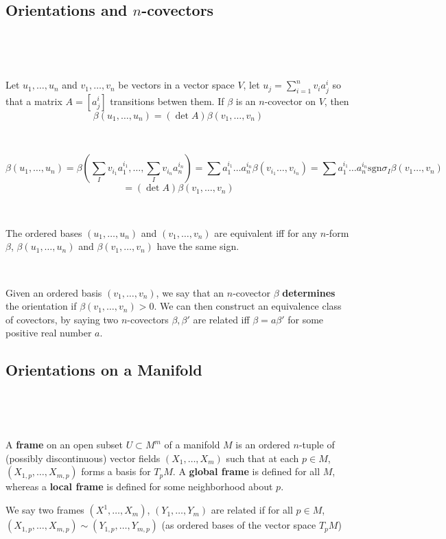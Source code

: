 \documentclass{article}
\begin{document}
\subsection{Orientations and $n$-covectors}
\

\begin{lemma}
  \

  Let $u_1, \dots, u_n$ and $v_1, \dots, v_n$ be vectors in a vector space $V$, let $u_j = \sum_{i=1}^n v_i a^i_j$ so that a matrix $A = [a^i_j]$ transitions betwen them. If $\beta$ is an $n$-covector on $V$, then $$\beta(u_1, \dots, u_n) = (\det A)\beta(v_1, \dots, v_n)$$
\end{lemma}

\begin{customproof}
  \

  $$\beta(u_1, \dots, u_n) = \beta(\sum_I v_{i_1} a_1^{i_1}, \dots, \sum_I v_{i_n}a^{i_n}_n) = \sum a_1^{i_1} \dots a_n^{i_n}\beta(v_{i_1} \dots, v_{i_n}) = \sum a_1^{i_1} \dots a_n^{i_n}\text{sgn} \sigma_I\beta(v_{1} \dots, v_{n})$$$$= (\det A)\beta(v_1, \dots, v_n)$$
\end{customproof}

\begin{corollary}
  \

  The ordered bases $(u_1, \dots, u_n)$ and $(v_1, \dots, v_n)$ are equivalent iff for any $n$-form $\beta$, $\beta(u_1, \dots, u_n)$ and $\beta(v_1, \dots, v_n)$ have the same sign.
\end{corollary}

\begin{definition}
  \

  Given an ordered basis $(v_1, \dots, v_n)$, we say that an $n$-covector $\beta$ \textbf{determines} the orientation if $\beta(v_1, \dots, v_n) > 0$. We can then construct an equivalence class of covectors, by saying two $n$-covectors $\beta, \beta'$ are related iff $\beta = a \beta'$ for some positive real number $a$.
\end{definition}

\subsection{Orientations on a Manifold}
\

\begin{definition}
  \

  A \textbf{frame} on an open subset $U \subset M^m$ of a manifold $M$ is an ordered $n$-tuple of (possibly discontinuous) vector fields $(X_1,\dots, X_m)$ such that at each $p \in M$, $(X_{1,p}, \dots, X_{m,p})$ forms a basis for $T_pM$. A \textbf{global frame} is defined for all $M$, whereas a \textbf{local frame} is defined for some neighborhood about $p$.

  We say two frames $(X^1, \dots, X_m)$, $(Y_1, \dots, Y_m)$ are related if for all $p \in M$, $(X_{1,p}, \dots, X_{m,p}) \sim (Y_{1,p}, \dots, Y_{m,p})$ (as ordered bases of the vector space $T_pM$)
\end{definition}
\end{document}
